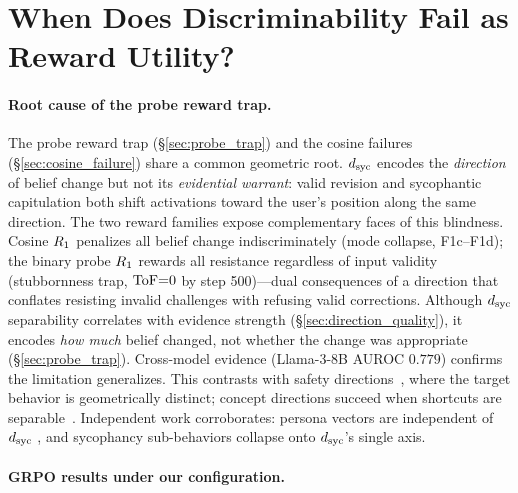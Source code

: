 \section{When Does Discriminability Fail as Reward Utility?}\label{sec:discussion}

\paragraph{Root cause of the probe reward trap.}
The probe reward trap (\S\ref{sec:probe_trap}) and the cosine failures (\S\ref{sec:cosine_failure}) share a common geometric root.
$d_{\text{syc}}$ encodes the \emph{direction} of belief change but not its \emph{evidential warrant}: valid revision and sycophantic capitulation both shift activations toward the user's position along the same direction.
The two reward families expose complementary faces of this blindness.
Cosine $R_1$ penalizes all belief change indiscriminately (mode collapse, F1c--F1d); the binary probe $R_1$ rewards all resistance regardless of input validity (stubbornness trap, $\text{ToF}{=}0$ by step 500)---dual consequences of a direction that conflates resisting invalid challenges with refusing valid corrections.
Although $d_{\text{syc}}$ separability correlates with evidence strength (\S\ref{sec:direction_quality}), it encodes \emph{how much} belief changed, not whether the change was appropriate (\S\ref{sec:probe_trap}).
Cross-model evidence (Llama-3-8B AUROC $0.779$) confirms the limitation generalizes.
This contrasts with safety directions~\citep{zhang2026latentgrpo}, where the target behavior is geometrically distinct; concept directions succeed when shortcuts are separable~\citep{wu2026rewardhacking}.
Independent work corroborates: persona vectors are independent of $d_{\text{syc}}$ \citep{kelkar2026persona}, and sycophancy sub-behaviors \citep{vennemeyer2025sycophancy} collapse onto $d_{\text{syc}}$'s single axis.

\paragraph{GRPO results under our configuration.}

